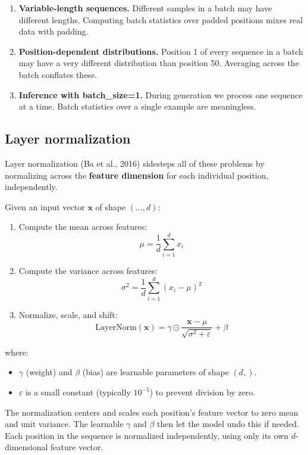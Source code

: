 \begin{enumerate}
  \item \textbf{Variable-length sequences.} Different samples in a batch may have different lengths. Computing batch statistics over padded positions mixes real data with padding.
  \item \textbf{Position-dependent distributions.} Position 1 of every sequence in a batch may have a very different distribution than position 50. Averaging across the batch conflates these.
  \item \textbf{Inference with batch\_size=1.} During generation we process one sequence at a time. Batch statistics over a single example are meaningless.
\end{enumerate}

\subsection{Layer normalization}

Layer normalization (Ba et al., 2016) sidesteps all of these problems by normalizing across the \textbf{feature dimension} for each individual position, independently.

Given an input vector $\mathbf{x}$ of shape $(\ldots, d)$:

\begin{enumerate}
  \item Compute the mean across features:
\[
\mu = \frac{1}{d}\sum_{i=1}^{d} x_i
\]

  \item Compute the variance across features:
\[
\sigma^2 = \frac{1}{d}\sum_{i=1}^{d}(x_i - \mu)^2
\]

  \item Normalize, scale, and shift:
\[
\mathrm{LayerNorm}(\mathbf{x}) = \gamma \odot \frac{\mathbf{x} - \mu}{\sqrt{\sigma^2 + \varepsilon}} + \beta
\]
\end{enumerate}

where:
\begin{itemize}
  \item $\gamma$ (weight) and $\beta$ (bias) are learnable parameters of shape $(d,)$.
  \item $\varepsilon$ is a small constant (typically $10^{-5}$) to prevent division by zero.
\end{itemize}

The normalization centers and scales each position's feature vector to zero mean and unit variance. The learnable $\gamma$ and $\beta$ then let the model undo this if needed. Each position in the sequence is normalized independently, using only its own $d$-dimensional feature vector.


